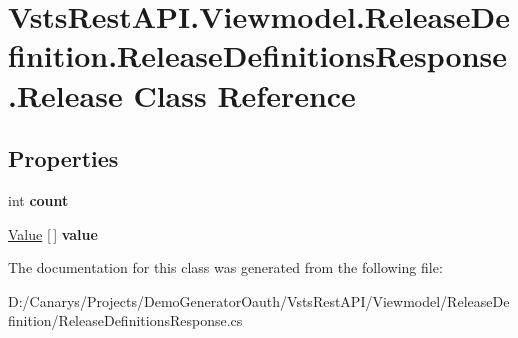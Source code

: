 \hypertarget{class_vsts_rest_a_p_i_1_1_viewmodel_1_1_release_definition_1_1_release_definitions_response_1_1_release}{}\section{Vsts\+Rest\+A\+P\+I.\+Viewmodel.\+Release\+Definition.\+Release\+Definitions\+Response.\+Release Class Reference}
\label{class_vsts_rest_a_p_i_1_1_viewmodel_1_1_release_definition_1_1_release_definitions_response_1_1_release}
\subsection*{Properties}
\begin{DoxyCompactItemize}
\item 
\mbox{\label{class_vsts_rest_a_p_i_1_1_viewmodel_1_1_release_definition_1_1_release_definitions_response_1_1_release_a6a03860789d22df76b4b28a27e452b43}} 
int {\bfseries count}
\item 
\mbox{\label{class_vsts_rest_a_p_i_1_1_viewmodel_1_1_release_definition_1_1_release_definitions_response_1_1_release_a2f0e444f07e70dce9c93c197667b7203}} 
\mbox{\hyperlink{class_vsts_rest_a_p_i_1_1_viewmodel_1_1_release_definition_1_1_release_definitions_response_1_1_value}{Value}} \mbox{[}$\,$\mbox{]} {\bfseries value}
\end{DoxyCompactItemize}


The documentation for this class was generated from the following file\+:\begin{DoxyCompactItemize}
\item 
D\+:/\+Canarys/\+Projects/\+Demo\+Generator\+Oauth/\+Vsts\+Rest\+A\+P\+I/\+Viewmodel/\+Release\+Definition/Release\+Definitions\+Response.\+cs\end{DoxyCompactItemize}
